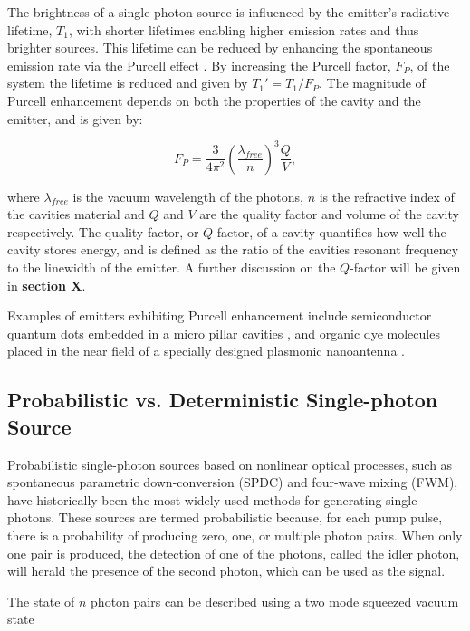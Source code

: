 The brightness of a single-photon source is influenced by the emitter’s radiative lifetime, $ T_1 $, with shorter lifetimes enabling higher emission rates and thus brighter sources. This lifetime can be reduced by enhancing the spontaneous emission rate via the Purcell effect \cite{Anonymous1946}. By increasing the Purcell factor, $ F_P $, of the system the lifetime is reduced and given by $ T_1' = T_1 / F_P $. The magnitude of Purcell enhancement depends on both the properties of the cavity and the emitter, and is given by:


\begin{equation}
    F_P = \frac{3}{4\pi^2}\left(\frac{\lambda_{free}}{n}\right)^3\frac{Q}{V}, 
    \label{eqn:Purcell_factor}
\end{equation}

where $\lambda_{free}$ is the vacuum wavelength of the photons, $n$ is the refractive index of the cavities material and $Q$ and $V$ are the quality factor and volume of the cavity respectively. The quality factor, or $Q$-factor, of a cavity quantifies how well the cavity stores energy, and is defined as the ratio of the cavities resonant frequency to the linewidth of the emitter. A further discussion on the $Q$-factor will be given in \textbf{section X}.

Examples of emitters exhibiting Purcell enhancement include semiconductor quantum dots embedded in a micro pillar cavities \cite{Engel2023}, and organic dye molecules placed in the near field of a specially designed plasmonic nanoantenna \cite{Zhao2020}. 

\subsection{Probabilistic vs. Deterministic Single-photon Source}

Probabilistic single-photon sources based on nonlinear optical processes, such as spontaneous parametric down-conversion (SPDC) and four-wave mixing (FWM), have historically been the most widely used methods for generating single photons. These sources are termed probabilistic because, for each pump pulse, there is a probability of producing zero, one, or multiple photon pairs. When only one pair is produced, the detection of one of the photons, called the idler photon, will herald the presence of the second photon, which can be used as the signal. 

The state of $n$ photon pairs can be described using a two mode squeezed vacuum state

